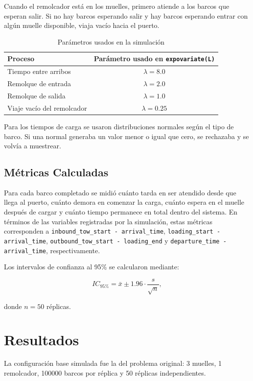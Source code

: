 \documentclass[12pt]{article}
\begin{document}
Cuando el remolcador está en los muelles, primero atiende a los barcos que esperan salir. Si no hay barcos esperando salir y hay barcos esperando entrar con algún muelle disponible, viaja vacío hacia el puerto.


\begin{table}[H]
\centering
\caption{Parámetros usados en la simulación}
\begin{tabular}{lc}
\toprule
\textbf{Proceso} & \textbf{Parámetro usado en \texttt{expovariate(L)}} \\
\midrule
Tiempo entre arribos & $\lambda = 8.0$ \\
Remolque de entrada & $\lambda = 2.0$ \\
Remolque de salida & $\lambda = 1.0$ \\
Viaje vacío del remolcador & $\lambda = 0.25$ \\
\bottomrule
\end{tabular}
\end{table}

Para los tiempos de carga se usaron distribuciones normales según el tipo de barco. Si una normal generaba un valor menor o igual que cero, se rechazaba y se volvía a muestrear.

\subsection{Métricas Calculadas}

Para cada barco completado se midió cuánto tarda en ser atendido desde que llega al puerto, cuánto demora en comenzar la carga, cuánto espera en el muelle después de cargar y cuánto tiempo permanece en total dentro del sistema. En términos de las variables registradas por la simulación, estas métricas corresponden a \texttt{inbound\_tow\_start - arrival\_time}, \texttt{loading\_start - arrival\_time}, \texttt{outbound\_tow\_start - loading\_end} y \texttt{departure\_time - arrival\_time}, respectivamente.

Los intervalos de confianza al 95\% se calcularon mediante:

\[
IC_{95\%} = \bar{x} \pm 1.96 \cdot \frac{s}{\sqrt{n}},
\]

donde $n=50$ réplicas.

\section{Resultados}

La configuración base simulada fue la del problema original: 3 muelles, 1 remolcador, 100000 barcos por réplica y 50 réplicas independientes. 
\end{document}
